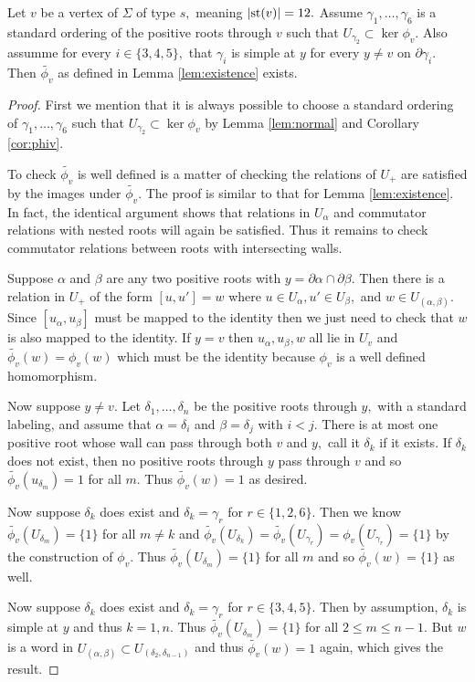 \documentclass[class=book, crop=false]{standalone}
\begin{document}
\begin{lemma} 
	\label{lem:336f2ex}
	Let $v$ be a vertex of $\Sigma$ of type $s,$ meaning $|\mathrm{st}(v)|=12.$ Assume $\gamma_1,\dots,\gamma_6$ is a standard ordering of the positive roots through $v$ such that $U_{\gamma_2}\subset \ker \phi_v.$ Also assumme for every $i\in \{3,4,5\},$ that $\gamma_i$ is simple at $y$ for every $y\neq v$ on $\partial \gamma_i.$ Then $\tilde{\phi_v}$ as defined in Lemma \ref{lem:existence} exists.
\end{lemma}
\begin{proof}
	First we mention that it is always possible to choose a standard ordering of $\gamma_1,\dots,\gamma_6$ such that $U_{\gamma_2}\subset \ker\phi_v$ by Lemma \ref{lem:normal} and Corollary \ref{cor:phiv}.

	To check $\tilde{\phi_v}$ is well defined is a matter of checking the relations of $U_+$ are satisfied by the images under $\tilde{\phi_v}.$ The proof is similar to that for Lemma \ref{lem:existence}. In fact, the identical argument shows that relations in $U_\alpha$ and commutator relations with nested roots will again be satisfied. Thus it remains to check commutator relations between roots with intersecting walls.

	Suppose $\alpha$ and $\beta$ are any two positive roots with $y=\partial\alpha\cap \partial\beta.$ Then there is a relation in $U_+$ of the form $[u,u']=w$ where $u\in U_\alpha, u'\in U_\beta,$ and $w\in U_{(\alpha,\beta)}.$ Since $[u_\alpha,u_\beta]$ must be mapped to the identity then we just need to check that $w$ is also mapped to the identity. If $y=v$ then $u_\alpha,u_\beta,w$ all lie in $U_v$ and $\tilde{\phi_v}(w)=\phi_v(w)$ which must be the identity because $\phi_v$ is a well defined homomorphism.

	Now suppose $y\neq v.$ Let $\delta_1,\dots,\delta_n$ be the positive roots through $y,$ with a standard labeling, and assume that $\alpha=\delta_i$ and $\beta=\delta_j$ with $i<j.$ There is at most one positive root whose wall can pass through both $v$ and $y,$ call it $\delta_k$ if it exists. If $\delta_k$ does not exist, then no positive roots through $y$ pass through $v$ and so $\tilde{\phi_v}(u_{\delta_m})=1$ for all $m.$ Thus $\tilde{\phi_v}(w)=1$ as desired.

	Now suppose $\delta_k$ does exist and $\delta_k=\gamma_r$ for $r\in \{1,2,6\}.$ Then we know $\tilde{\phi_v}(U_{\delta_m})=\{1\}$ for all  $m\neq k$ and $\tilde{\phi_v}(U_{\delta_k})=\tilde{\phi_v}(U_{\gamma_r})=\phi_v(U_{\gamma_r})=\{1\}$ by the construction of $\phi_v.$ Thus $\tilde{\phi_v}(U_{\delta_m})=\{1\}$ for all $m$ and so $\tilde{\phi_v}(w)=\{1\}$ as well.

	Now suppose $\delta_k$ does exist and $\delta_k=\gamma_r$ for $r\in \{3,4,5\}.$ Then by assumption, $\delta_k$ is simple at $y$ and thus $k=1,n.$ Thus $\tilde{\phi_v}(U_{\delta_m})=\{1\}$ for all $2\le m\le n-1.$ But $w$ is a word in $U_{(\alpha,\beta)}\subset U_{(\delta_2,\delta_{n-1})}$ and thus $\tilde{\phi_v}(w)=1$ again, which gives the result.
\end{proof}
\end{document}
